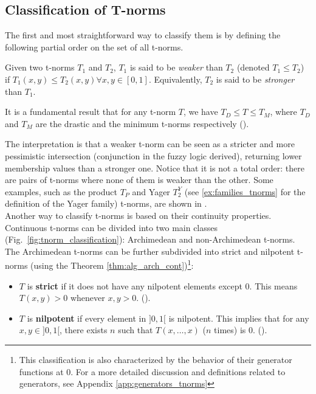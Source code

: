 \subsection{Classification of T-norms}\label{sec:class_tnorms}
The first and most straightforward way to classify them is by defining the following partial order on the set of all t-norms. 
\begin{definition}\label{def:weaker}
  Given two t-norms $T_1$ and $T_2$, $T_1$ is said to be \emph{weaker} than $T_2$ (denoted $T_1 \leq T_2$) if $T_1(x,y) \leq T_2(x,y) \forall x,y \in [0,1]$.
  Equivalently, $T_2$ is said to be \emph{stronger} than $T_1$.
\end{definition}

\begin{remark}
  It is a fundamental result that for any t-norm $T$, we have $T_D \leq T \leq T_M$, where $T_D$ and $T_M$ are the drastic and the minimum t-norms respectively (\cite[Rem.~1.5]{Klement2000}).
\end{remark}

The interpretation is that a weaker t-norm can be seen as a stricter and more pessimistic intersection (conjunction in the fuzzy logic derived), returning lower membership values than a stronger one. Notice that it is not a total order: there are pairs of t-norms where none of them is weaker than the other. Some examples, such as the product $T_P$ and Yager $T_2^Y$ (see \ref{ex:families_tnorms} for the definition of the Yager family) t-norms, are shown in \cite[Fig.~6.1]{Klement2000}.\\


Another way to classify t-norms is based on their continuity properties. Continuous t-norms can be divided into two main classes (Fig.~\ref{fig:tnorm_classification}): Archimedean and non-Archimedean t-norms. The Archimedean t-norms can be further subdivided into strict and nilpotent t-norms (using the Theorem \ref{thm:alg_arch_cont})\footnote{This classification is also characterized by the behavior of their generator functions at 0. For a more detailed discussion and definitions related to generators, see Appendix \ref{app:generators_tnorms}}:

\begin{itemize}
    \item $T$ is \textbf{strict} if it does not have any nilpotent elements except $0$. This means $T(x,y)>0$ whenever $x,y > 0$. (\cite[Cor.~3.30(i)]{Klement2000}).
    \item $T$ is \textbf{nilpotent} if every element in $]0,1[$ is nilpotent. This implies that for any $x,y \in ]0,1[$, there exists $n$ such that $T(x, \dots, x)$ ($n$ times) is $0$. (\cite[Cor.~3.30(ii)]{Klement2000}).
\end{itemize}


